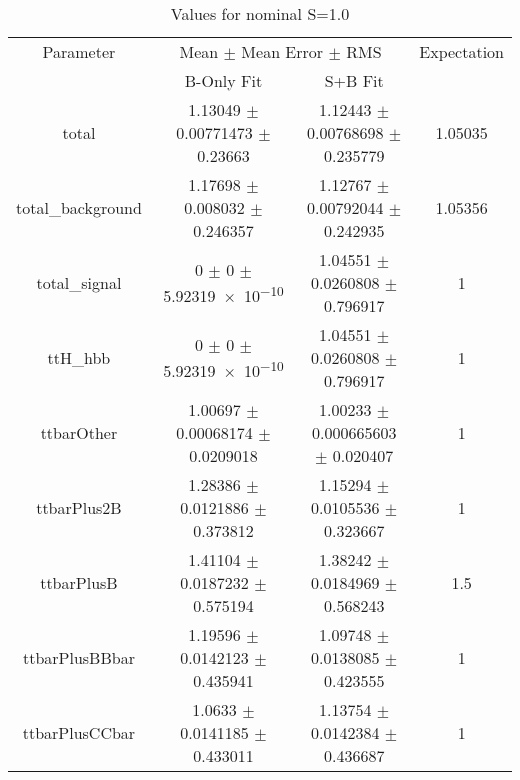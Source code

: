\begin{table}
\centering
\caption{Values for nominal S=1.0}
\begin{tabular}{cccc}
\toprule
Parameter & \multicolumn{2}{c}{Mean $\pm$ Mean Error $\pm$ RMS} & Expectation\\
 & B-Only Fit & S+B Fit & \\
\midrule
total & \num{1.13049} $\pm$ \num{0.00771473} $\pm$ \num{0.23663} & \num{1.12443} $\pm$ \num{0.00768698} $\pm$ \num{0.235779} & \num{1.05035}\\
total\_background & \num{1.17698} $\pm$ \num{0.008032} $\pm$ \num{0.246357} & \num{1.12767} $\pm$ \num{0.00792044} $\pm$ \num{0.242935} & \num{1.05356}\\
total\_signal & \num{0} $\pm$ \num{0} $\pm$ \num{5.92319e-10} & \num{1.04551} $\pm$ \num{0.0260808} $\pm$ \num{0.796917} & \num{1}\\
ttH\_hbb & \num{0} $\pm$ \num{0} $\pm$ \num{5.92319e-10} & \num{1.04551} $\pm$ \num{0.0260808} $\pm$ \num{0.796917} & \num{1}\\
ttbarOther & \num{1.00697} $\pm$ \num{0.00068174} $\pm$ \num{0.0209018} & \num{1.00233} $\pm$ \num{0.000665603} $\pm$ \num{0.020407} & \num{1}\\
ttbarPlus2B & \num{1.28386} $\pm$ \num{0.0121886} $\pm$ \num{0.373812} & \num{1.15294} $\pm$ \num{0.0105536} $\pm$ \num{0.323667} & \num{1}\\
ttbarPlusB & \num{1.41104} $\pm$ \num{0.0187232} $\pm$ \num{0.575194} & \num{1.38242} $\pm$ \num{0.0184969} $\pm$ \num{0.568243} & \num{1.5}\\
ttbarPlusBBbar & \num{1.19596} $\pm$ \num{0.0142123} $\pm$ \num{0.435941} & \num{1.09748} $\pm$ \num{0.0138085} $\pm$ \num{0.423555} & \num{1}\\
ttbarPlusCCbar & \num{1.0633} $\pm$ \num{0.0141185} $\pm$ \num{0.433011} & \num{1.13754} $\pm$ \num{0.0142384} $\pm$ \num{0.436687} & \num{1}\\
\bottomrule
\end{tabular}
\end{table}